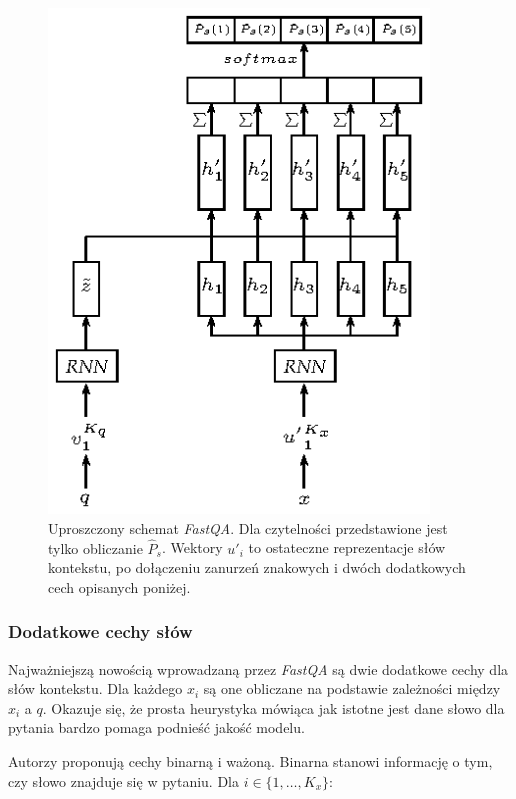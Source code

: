 \begin{figure}[H]
  \centering
    \includegraphics[width=0.9\textwidth]{chapter4/img/fastqa.eps}
  \caption{\small{Uproszczony schemat \textit{FastQA}. Dla czytelności przedstawione jest tylko obliczanie $\hat{P}_s$}. Wektory $u'_i$ to ostateczne reprezentacje słów kontekstu, po dołączeniu zanurzeń znakowych i dwóch dodatkowych cech opisanych poniżej.}
  \label{rysfqa}
\end{figure}


\subsubsection{Dodatkowe cechy słów}

Najważniejszą nowością wprowadzaną przez \textit{FastQA} są dwie dodatkowe cechy dla słów kontekstu. Dla każdego $x_i$ są one obliczane na podstawie zależności między $x_i$ a $q$. Okazuje się, że prosta heurystyka mówiąca jak istotne jest dane słowo dla pytania bardzo pomaga podnieść jakość modelu.

Autorzy proponują cechy binarną i ważoną. Binarna stanowi informację o tym, czy słowo znajduje się w pytaniu. Dla $i \in \{1,\dots,K_x\}$:

